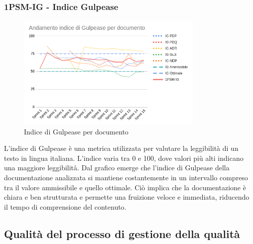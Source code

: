 \documentclass{article}
\begin{document}
        \subsubsection{1PSM-IG - Indice Gulpease}
        \begin{figure}[H]
            \centering
            \includegraphics[width=0.8\textwidth]{../../../img/pdq_charts/chart5-indiceGulpease.png}
            \caption{Indice di Gulpease per documento}
        \end{figure}
        L'indice di Gulpease è una metrica utilizzata per valutare la leggibilità di un testo in lingua italiana.
        L’indice varia tra 0 e 100, dove valori più alti indicano una maggiore leggibilità.
        Dal grafico emerge che l’indice di Gulpease della documentazione analizzata si mantiene costantemente in un intervallo compreso tra il valore ammissibile e quello ottimale.
        Ciò implica che la documentazione è chiara e ben strutturata e permette una fruizione veloce e immediata, riducendo il tempo di comprensione del contenuto.


    \subsection{Qualità del processo di gestione della qualità}
\end{document}
